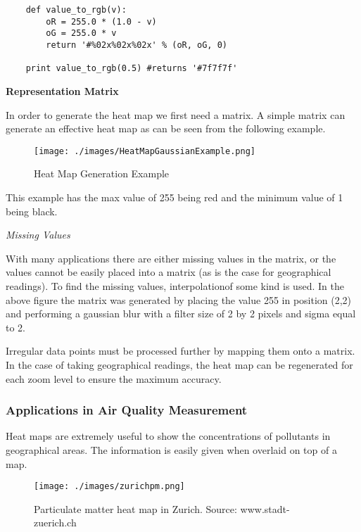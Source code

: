 \begin{verbatim}	
	def value_to_rgb(v):
	    oR = 255.0 * (1.0 - v)
	    oG = 255.0 * v
	    return '#%02x%02x%02x' % (oR, oG, 0)
	    
	print value_to_rgb(0.5) #returns '#7f7f7f'
\end{verbatim}


\textbf{Representation Matrix}

In order to generate the heat map we first need a matrix. A simple matrix can generate an effective heat map as can be seen from the following example.

\begin{figure}[H]
        \begin{center}
                \texttt{[image: ./images/HeatMapGaussianExample.png]}
                \caption{Heat Map Generation Example}
        \end{center}
\end{figure}

This example has the max value of 255 being red and the minimum value of 1 being black. 

\emph{Missing Values}

With many applications there are either missing values in the matrix, or the values cannot be easily placed into a matrix (as is the case for geographical readings). To find the missing values, interpolationof some kind is used. In the above figure the matrix was generated by placing the value 255 in position (2,2) and performing a gaussian blur with a filter size of 2 by 2 pixels and sigma equal to 2. 

Irregular data points must be processed further by mapping them onto a matrix. In the case of taking geographical readings, the heat map can be regenerated for each zoom level to ensure the maximum accuracy. 

\subsubsection{Applications in Air Quality Measurement}\label{applicationsinaqmeasurement}

Heat maps are extremely useful to show the concentrations of pollutants in geographical areas. The information is easily given when overlaid on top of a map.  

\begin{figure}[H]
        \begin{center}
                \texttt{[image: ./images/zurichpm.png]}
                \caption{Particulate matter heat map in Zurich. Source: www.stadt-zuerich.ch}
        \end{center}
\end{figure}

